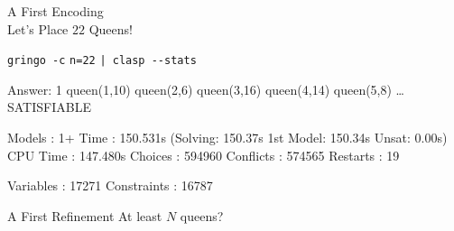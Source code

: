 \begin{frame}[fragile]{A First Encoding\\
              \normalsize Let's Place \alert{$22$} Queens!}
\begin{block}{\alert<1>{\lstinline{gringo -c} \alert{\lstinline{n=22}}  \lstinline{| clasp --stats}}}
\vspace*{-3mm}
\pause\footnotesize%
\begin{semiverbatim}
Answer: 1
queen(1,10) queen(2,6) queen(3,16) queen(4,14) queen(5,8) \dots{}
SATISFIABLE

Models      : 1+
\alert<2>{Time        : 150.531s} (Solving: 150.37s 1st Model: 150.34s Unsat: 0.00s)
CPU Time    : 147.480s
Choices     : 594960
\alert<2>{Conflicts   : 574565}
Restarts    : 19

Variables   : 17271
Constraints : 16787
\end{semiverbatim}
\end{block}
\end{frame}
\begin{frame}[fragile]{A First Refinement}
  At least $N$ queens?\hfill  \alert<4>{   }
\end{frame}
